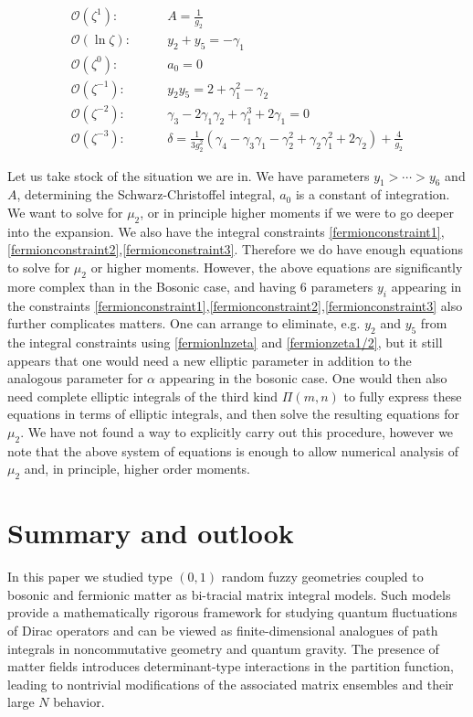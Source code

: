 \documentclass[10pt]{article}
\newcommand{\mcal}[1]{\mathcal{#1}}
\theoremstyle{plain}
\theoremstyle{definition}
\theoremstyle{plain}
\begin{document}
\begin{align}
	\mcal{O}(\zeta^1):\qquad& \boxed{A = \frac{1}{g_2}} \\
	\mcal{O}(\ln\zeta):\qquad& \boxed{y_2 + y_5=-\gamma_1} \label{fermionlnzeta}\\  
	\mcal{O}(\zeta^0):\qquad& \boxed{a_0=0} \\
	\mcal{O}(\zeta^{-1}):\qquad&\boxed{y_2y_5 = 2 + \gamma_1^2 - \gamma_2 }\label{fermionzeta1/2}\\
	\mcal{O}(\zeta^{-2}):\qquad& \boxed{\gamma_3-2\gamma_1\gamma_2  +\gamma_1^3 + 2\gamma_1 = 0} \\
	\mcal{O}(\zeta^{-3}):\qquad&\boxed{\delta = \frac{1}{3g_2^2}(\gamma_4 - \gamma_3\gamma_1 - \gamma_2^2 + \gamma_2\gamma_1^2 + 2\gamma_2)+\frac{4}{g_2}}
\end{align}

Let us take stock of the situation we are in. We have parameters $y_1>\cdots>y_6$ and $A$, determining the Schwarz-Christoffel integral, $a_0$ is a constant of integration. We want to solve for $\mu_2$, or in principle higher moments if we were to go deeper into the expansion. We also have the integral constraints \ref{fermionconstraint1},\ref{fermionconstraint2},\ref{fermionconstraint3}. Therefore we do have enough equations to solve for $\mu_2$ or higher moments. However, the above equations are significantly more complex than in the Bosonic case, and having $6$ parameters $y_i$ appearing in the constraints \ref{fermionconstraint1},\ref{fermionconstraint2},\ref{fermionconstraint3} also further complicates matters. One can arrange to eliminate, e.g. $y_2$ and $y_5$ from the integral constraints using \ref{fermionlnzeta} and \ref{fermionzeta1/2}, but it still appears that one would need a new elliptic parameter in addition to the analogous parameter for $\alpha$ appearing in the bosonic case. One would then also need complete elliptic integrals of the third kind $\Pi(m,n)$ to fully express these equations in terms of elliptic integrals, and then solve the resulting equations for $\mu_2$. We have not found a way to explicitly carry out this procedure, however we note that the above system of equations is enough to allow numerical analysis of $\mu_2$ and, in principle, higher order moments. 


\section*{Summary and outlook}

In this paper we studied type $(0,1)$ random fuzzy geometries coupled to bosonic and fermionic matter as bi-tracial matrix integral models. Such models provide a mathematically rigorous framework for studying quantum fluctuations of Dirac operators and can be viewed as finite-dimensional analogues of path integrals in noncommutative geometry and quantum gravity. The presence of matter fields introduces determinant-type interactions in the partition function, leading to nontrivial modifications of the associated matrix ensembles and their large $N$ behavior. 
\end{document}
